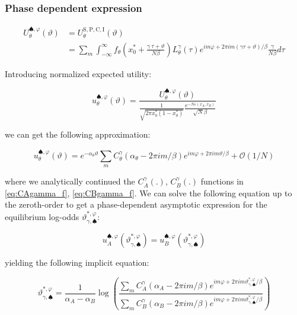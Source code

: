 \documentclass{article}
\theoremstyle{definition}
\begin{document}
\subsubsection{Phase dependent expression}

\begin{equation}
    \begin{split}
        U_\theta^{\spadesuit,\varphi}(\vartheta) &= 
        U_\theta^\mathrm{S,P,C,I}(\vartheta) \\
        &= 
        \sum_m \int_{-\infty}^\infty 
        f_\theta \left ( x_0^* + \frac{\gamma \ \tau + \vartheta}{N \beta} \right ) L^\gamma_\theta(\tau)
        e^{i m \varphi + 2 \pi i m (\gamma \tau + \vartheta)/\beta}
        \frac{\gamma}{N \beta} d\tau
    \end{split}
\end{equation}

Introducing normalized expected utility:

\begin{equation}
    u_\theta^{\spadesuit,\varphi}(\vartheta) = 
    \frac{U_\theta^{\spadesuit,\varphi}(\vartheta)}{
    \frac{1}{\sqrt{2 \pi x_0^* (1-x_0^*)}} \frac{e^{- N \varepsilon(x_A,x_B)}}{\sqrt{N} \beta}
    }
\end{equation}

we can get the following approximation:

\begin{equation}
    u_\theta^{\spadesuit,\varphi}(\vartheta) = 
    e^{-\alpha_\theta \vartheta}
    \sum_m C^\gamma_\theta(\alpha_\theta - 2 \pi i m/\beta) e^{i m \varphi + 2 \pi i m \vartheta / \beta }
    +\mathcal{O}(1/N)
\end{equation}

where we analytically continued the $C^\gamma_A(.)$, $C^\gamma_B(.)$ functions in \eqref{eq:CAgamma_f}, \eqref{eq:CBgamma_f}.
We can solve the following equation up to the zeroth-order to get a phase-dependent asymptotic expression for the equilibrium log-odds $\vartheta^{*,\varphi}_{\gamma,\spadesuit}$:

\begin{equation}
    u_A^{\spadesuit,\varphi}(\vartheta^{*,\varphi}_{\gamma,\spadesuit}) =
    u_B^{\spadesuit,\varphi}(\vartheta^{*,\varphi}_{\gamma,\spadesuit})
\end{equation}

yielding the following implicit equation:

\begin{equation}
\label{eq:ImplicitvarphigammaCACB}
    \vartheta^{*,\varphi}_{\gamma,\spadesuit} = 
    \frac{1}{\alpha_A - \alpha_B} \log \left (
    \frac{
    \sum_m C^\gamma_A(\alpha_A - 2 \pi i m/\beta) e^{i m \varphi + 2 \pi i m \vartheta^{*,\varphi}_{\gamma,\spadesuit} / \beta }
    }
    {
    \sum_m C^\gamma_B(\alpha_B - 2 \pi i m/\beta) e^{i m \varphi + 2 \pi i m \vartheta^{*,\varphi}_{\gamma,\spadesuit} / \beta }
    }
    \right )
\end{equation}
\end{document}

